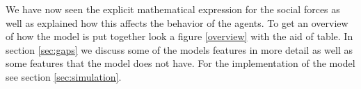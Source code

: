 We have now seen the explicit mathematical expression for the social forces 
as well as explained how this affects the behavior of the agents. To get an 
overview of how the model is put together look a figure \ref{overview} with 
the aid of table. In section \ref{sec:gaps} 
we discuss some of the models features in more detail as well as some features 
that the model does not have. For the implementation of the model see section \ref{sec:simulation}.

